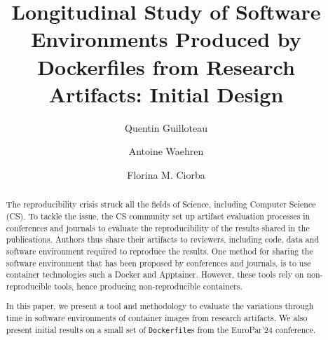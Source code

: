 \documentclass[sigconf,natbib=false]{acmart}
\newcommand{\df}{\texttt{Dockerfile}}
\begin{document}
\title{%
  Longitudinal Study of Software Environments Produced by Dockerfiles from Research Artifacts: Initial Design%
}


\author{Quentin Guilloteau}

\author{Antoine Waehren}

\author{Florina M. Ciorba}



\begin{abstract}
  The reproducibility crisis struck all the fields of Science, including Computer Science (CS).
  To tackle the issue, the CS community set up artifact evaluation processes in conferences and journals to evaluate the reproducibility of the results shared in the publications.
  Authors thus share their artifacts to reviewers, including code, data and software environment required to reproduce the results.
  One method for sharing the software environment that has been proposed by conferences and journals, is to use container technologies such a Docker and Apptainer.
  However, these tools rely on non-reproducible tools, hence producing non-reproducible containers.

  In this paper, we present a tool and methodology to evaluate the variations through time in software environments of container images from research artifacts.
  We also present initial results on a small set of \df s from the EuroPar'24 conference.
\end{abstract}
\end{document}
